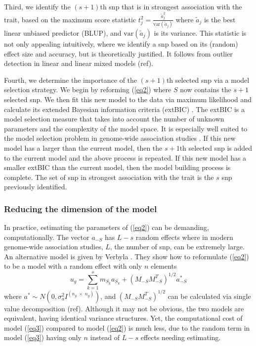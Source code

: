 \documentclass{article}
\begin{document}
Third, we identify the $(s+1)$th snp that is in strongest association with the trait, based on the maximum score statistic
$t_j^2 = \frac{ \widetilde{a} _j^2}{\textrm{var}(\widetilde{a}_j)}$ where $\widetilde{a}_j$ is the best linear unbiased predictor (BLUP), 
and $\textrm{var}(\widetilde{a}_j)$ is its variance. This statistic is not only appealing intuitively, where we 
identify a snp based on its (random) effect size and accuracy, but is theoretically justified.  It follows from outlier detection 
in linear and linear mixed models (ref). 

Fourth, we determine the importance of the $(s+1)$th selected snp via a model selection strategy. 
We begin by reforming (\ref{eq2}) where $S$ now contains the $s + 1$ selected snp.  We then fit this new model to the data
via maximum likelihood and calculate its extended Bayesian information criteria (extBIC) \cite{chen2008extended}.  The 
extBIC is a model selection measure that takes into account the number of unknown parameters and the complexity 
of the model space.  It is especially well suited to the model selection problem in genome-wide association studies \cite{chen2008extended}. If this new model has a larger  than the current model, then the $s+1$th selected snp is added to 
the current model and the above process is repeated. If this new model has a smaller extBIC than the current model, then the 
model building process is complete. The set of snp in strongest association with the trait is the $s$ snp previously identified. 

\subsubsection{Reducing the dimension of the model}
In practice, estimating the parameters of (\ref{eq2}) can be demanding, computationally. 
The vector $a_{-S}$ has $L-s$ random effects where in modern genome-wide association studies, 
$L$, the number of snp, can be extremely large.  An alternative model is given by 
Verbyla \cite{verbyla2012rwgaim,verbyla2014whole}. 
They show how to reformulate (\ref{eq2}) to be a model with a random effect with only $n$ elements
\begin{equation}
\label{eq3}
u_g = \sum_{k=1}^s  m_{S_k} a_{S_k} + (M_{-S} M_{-S}^T)^{1/2} a^*_{-S}
\end{equation}
where $a^* \sim N(0, \sigma_a^2 I^{(n_g \; \times \;  n_g)})$, and 
$(M_{-S} M_{-S}^T)^{1/2}$ can be calculated via single value decomposition (ref).  
Although it may not be obvious, the two models are equivalent, 
having identical variance structures. Yet, the computational cost of model (\ref{eq3}) compared to 
model (\ref{eq2}) is much less, due to the random term in model (\ref{eq3}) having only $n$ instead of $L-s$ 
effects needing estimating. 
\end{document}
